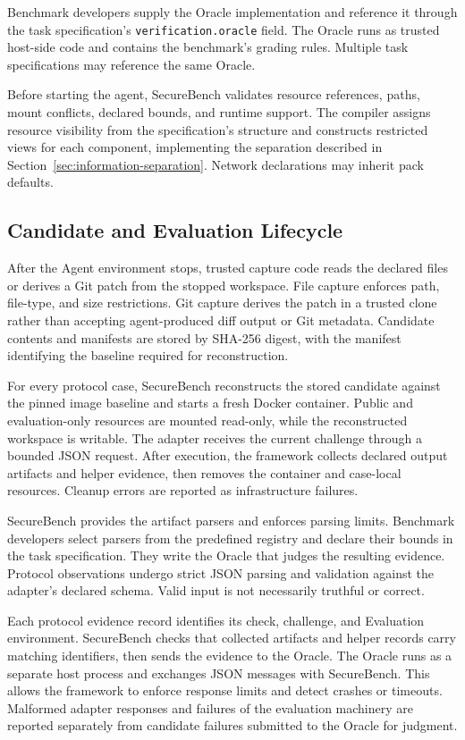 \documentclass[conference]{IEEEtran}
\begin{document}
Benchmark developers supply the Oracle implementation and reference it through the task specification's \texttt{verification.oracle} field. The Oracle runs as trusted host-side code and contains the benchmark's grading rules. Multiple task specifications may reference the same Oracle.

Before starting the agent, SecureBench validates resource references, paths, mount conflicts, declared bounds, and runtime support. The compiler assigns resource visibility from the specification's structure and constructs restricted views for each component, implementing the separation described in Section~\ref{sec:information-separation}. Network declarations may inherit pack defaults.

\subsection{Candidate and Evaluation Lifecycle}

After the Agent environment stops, trusted capture code reads the declared files or derives a Git patch from the stopped workspace. File capture enforces path, file-type, and size restrictions. Git capture derives the patch in a trusted clone rather than accepting agent-produced diff output or Git metadata. Candidate contents and manifests are stored by SHA-256 digest, with the manifest identifying the baseline required for reconstruction.

For every protocol case, SecureBench reconstructs the stored candidate against the pinned image baseline and starts a fresh Docker container. Public and evaluation-only resources are mounted read-only, while the reconstructed workspace is writable. The adapter receives the current challenge through a bounded JSON request. After execution, the framework collects declared output artifacts and helper evidence, then removes the container and case-local resources. Cleanup errors are reported as infrastructure failures.

SecureBench provides the artifact parsers and enforces parsing limits. Benchmark developers select parsers from the predefined registry and declare their bounds in the task specification. They write the Oracle that judges the resulting evidence. Protocol observations undergo strict JSON parsing and validation against the adapter's declared schema. Valid input is not necessarily truthful or correct.

Each protocol evidence record identifies its check, challenge, and Evaluation environment. SecureBench checks that collected artifacts and helper records carry matching identifiers, then sends the evidence to the Oracle. The Oracle runs as a separate host process and exchanges JSON messages with SecureBench. This allows the framework to enforce response limits and detect crashes or timeouts. Malformed adapter responses and failures of the evaluation machinery are reported separately from candidate failures submitted to the Oracle for judgment.
\end{document}
